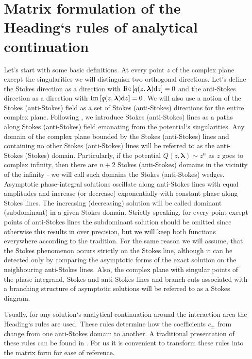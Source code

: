 \documentclass[12pt]{iopart}
\def\lmbd{\bm{\lambda}}
\def\Re{\mathrm{Re}}
\def\Im{\mathrm{Im}}
\newcommand\phsintgrnd[1][z]{q(#1,\lmbd)}
\begin{document}
\section{Matrix formulation of the Heading`s rules of analytical continuation \label{sec:mtrxfrm}}
Let's start with some basic definitions. At every point $z$ of the complex plane except the 
singularities we will distinguish two orthogonal directions. Let's define the Stokes direction 
as a direction with $\Re \left[ \phsintgrnd \rmd z \right]=0$ and the anti-Stokes direction 
as a direction with $\Im \left[ \phsintgrnd \rmd z \right]=0$. We will also use a notion of 
the Stokes (anti-Stokes) field as a set of Stokes (anti-Stokes) directions for the entire 
complex plane. Following \cite{heading, white}, we introduce Stokes (anti-Stokes) lines as a 
paths along Stokes (anti-Stokes) field emanating from the potential`s singularities. 
Any domain of the complex plane bounded by the Stokes (anti-Stokes) lines and containing no other 
Stokes (anti-Stokes) lines will be referred to as the anti-Stokes (Stokes) domain. Particularly, if 
the potential $Q(z,\lmbd) \sim z^n$ as $z$ goes to complex infinity, then there are $n+2$ Stokes 
(anti-Stokes) domains in the vicinity of the infinity - we will call such domains the Stokes 
(anti-Stokes) wedges. Asymptotic phase-integral solutions  oscillate along anti-Stokes 
lines with equal amplitudes and increase (or decrease) exponentially with constant phase along Stokes lines. 
The increasing (decreasing) solution will be called dominant (subdominant) in a given Stokes domain. 
Strictly speaking, for every point except points of anti-Stokes lines the subdominant solution 
should be omitted since otherwise this results in over precision, but we will keep both functions 
everywhere according to the tradition. For the same reason we will assume, that the Stokes phenomenon 
occurs strictly on the Stokes line, although it can be detected only by comparing the asymptotic forms 
of the exact solution on the neighbouring anti-Stokes lines. Also, the complex plane with singular points
of the phase integrand, Stokes and anti-Stokes lines and branch cuts associated with a 
branching structure of asymptotic solutions  will be referred to as a Stokes diagram.

Usually, for any solution`s analytical continuation around the interaction area 
the Heading`s rules are used. These rules determine how the coefficients $c_\pm$ 
from  change from one anti-Stokes domain to another. A traditional presentation 
of these rules can be found in \cite{heading, white}. For us it is convenient to transform 
these rules into the matrix form for ease of reference.
\end{document}
